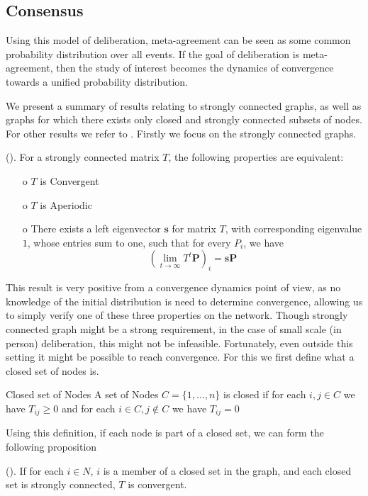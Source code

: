 \subsection{Consensus}
\label{sub: concensus DeGroot}
Using this model of deliberation, meta-agreement can be seen as some common probability distribution over all events. If the goal of deliberation is meta-agreement, then the study of interest becomes the dynamics of convergence towards a unified probability distribution.

We present a summary of results relating to strongly connected graphs, as well as graphs for which there exists only closed and strongly connected subsets of nodes. For other results we refer to \citet{Golub_Jackson_2010}. Firstly we focus on the strongly connected graphs.

\begin{proposition}{(\citet{Golub_Jackson_2010}).}
	For a strongly connected matrix \(T\), the following properties are equivalent:
	\begin{itemize}
		\item[o] \(T\) is Convergent
		\item[o] \(T\) is Aperiodic
		\item[o] There exists a left eigenvector \(\boldsymbol{s}\) for matrix \(T\), with corresponding eigenvalue \(1\), whose entries sum to one, such that for every $P_i$, we have 
			\[\left(\lim_{t\to \infty}T^{t} \boldsymbol{P}\right)_{i} = \boldsymbol{s}\boldsymbol{P}\]
	\end{itemize}
\end{proposition}

This result is very positive from a convergence dynamics point of view, as no knowledge of the initial distribution is need to determine convergence, allowing us to simply verify one of these three properties on the network. Though strongly connected graph might be a strong requirement, in the case of small scale (in person) deliberation, this might not be infeasible. Fortunately, even outside this setting it might be possible to reach convergence. For this we first define what a closed set of nodes is.

\begin{definition}{Closed set of Nodes}{}
	A set of Nodes \(C = \{1, \dots, n\}\) is closed if for each \(i,j \in C\) we have $T_{ij} \geq 0$ and for each \(i \in C, j \notin C\) we have \(T_{ij} = 0\)
\end{definition}

Using this definition, if each node is part of a closed set, we can form the following proposition 

\begin{proposition}{(\citet{Golub_Jackson_2010}).}
	If for each \(i \in N\), \(i\) is a member of a closed set in the graph, and each closed set is strongly connected, \(T\) is convergent.
\end{proposition}








